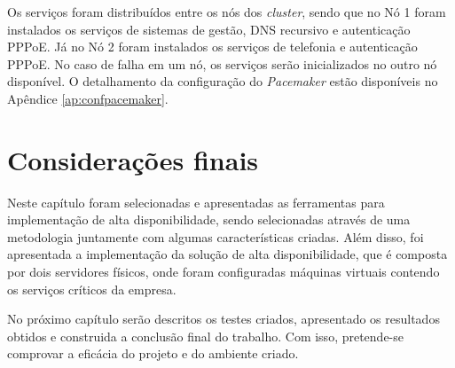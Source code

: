 
Os serviços foram distribuídos entre os nós dos \textit{cluster}, sendo que no Nó 1 foram instalados os serviços de sistemas de gestão, 
\ac{DNS} recursivo e autenticação \ac{PPPoE}. Já no Nó 2 foram instalados os serviços de telefonia e autenticação \ac{PPPoE}.
No caso de falha em um nó, os serviços serão inicializados no outro nó disponível. O detalhamento da configuração do \textit{Pacemaker} 
estão disponíveis no Apêndice \ref{ap:confpacemaker}.


\section{Considerações finais}

Neste capítulo foram selecionadas e apresentadas as ferramentas para implementação de alta disponibilidade, sendo selecionadas através de uma
metodologia juntamente com algumas características criadas. Além disso, foi apresentada a implementação da solução de alta disponibilidade, que é
composta por dois servidores físicos, onde foram configuradas máquinas virtuais contendo os serviços críticos da empresa. 

No próximo capítulo serão descritos os testes criados, apresentado os resultados obtidos e construida a conclusão final do trabalho. 
Com isso, pretende-se comprovar a eficácia do projeto e do ambiente criado.

